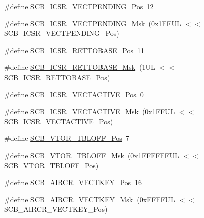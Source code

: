 \begin{DoxyCompactItemize}
\item 
\#define \mbox{\hyperlink{group___c_m_s_i_s___s_c_b_gada60c92bf88d6fd21a8f49efa4a127b8}{S\+C\+B\+\_\+\+I\+C\+S\+R\+\_\+\+V\+E\+C\+T\+P\+E\+N\+D\+I\+N\+G\+\_\+\+Pos}}~12
\item 
\#define \mbox{\hyperlink{group___c_m_s_i_s___s_c_b_gacb6992e7c7ddc27a370f62878a21ef72}{S\+C\+B\+\_\+\+I\+C\+S\+R\+\_\+\+V\+E\+C\+T\+P\+E\+N\+D\+I\+N\+G\+\_\+\+Msk}}~(0x1\+F\+F\+U\+L $<$$<$ S\+C\+B\+\_\+\+I\+C\+S\+R\+\_\+\+V\+E\+C\+T\+P\+E\+N\+D\+I\+N\+G\+\_\+\+Pos)
\item 
\#define \mbox{\hyperlink{group___c_m_s_i_s___s_c_b_ga403d154200242629e6d2764bfc12a7ec}{S\+C\+B\+\_\+\+I\+C\+S\+R\+\_\+\+R\+E\+T\+T\+O\+B\+A\+S\+E\+\_\+\+Pos}}~11
\item 
\#define \mbox{\hyperlink{group___c_m_s_i_s___s_c_b_gaca6fc3f79bb550f64fd7df782ed4a5f6}{S\+C\+B\+\_\+\+I\+C\+S\+R\+\_\+\+R\+E\+T\+T\+O\+B\+A\+S\+E\+\_\+\+Msk}}~(1\+U\+L $<$$<$ S\+C\+B\+\_\+\+I\+C\+S\+R\+\_\+\+R\+E\+T\+T\+O\+B\+A\+S\+E\+\_\+\+Pos)
\item 
\#define \mbox{\hyperlink{group___c_m_s_i_s___s_c_b_gae4f602c7c5c895d5fb687b71b0979fc3}{S\+C\+B\+\_\+\+I\+C\+S\+R\+\_\+\+V\+E\+C\+T\+A\+C\+T\+I\+V\+E\+\_\+\+Pos}}~0
\item 
\#define \mbox{\hyperlink{group___c_m_s_i_s___s_c_b_ga5533791a4ecf1b9301c883047b3e8396}{S\+C\+B\+\_\+\+I\+C\+S\+R\+\_\+\+V\+E\+C\+T\+A\+C\+T\+I\+V\+E\+\_\+\+Msk}}~(0x1\+F\+F\+U\+L $<$$<$ S\+C\+B\+\_\+\+I\+C\+S\+R\+\_\+\+V\+E\+C\+T\+A\+C\+T\+I\+V\+E\+\_\+\+Pos)
\item 
\#define \mbox{\hyperlink{group___c_m_s_i_s___s_c_b_gac6a55451ddd38bffcff5a211d29cea78}{S\+C\+B\+\_\+\+V\+T\+O\+R\+\_\+\+T\+B\+L\+O\+F\+F\+\_\+\+Pos}}~7
\item 
\#define \mbox{\hyperlink{group___c_m_s_i_s___s_c_b_ga75e395ed74042923e8c93edf50f0996c}{S\+C\+B\+\_\+\+V\+T\+O\+R\+\_\+\+T\+B\+L\+O\+F\+F\+\_\+\+Msk}}~(0x1\+F\+F\+F\+F\+F\+F\+U\+L $<$$<$ S\+C\+B\+\_\+\+V\+T\+O\+R\+\_\+\+T\+B\+L\+O\+F\+F\+\_\+\+Pos)
\item 
\#define \mbox{\hyperlink{group___c_m_s_i_s___s_c_b_gaaa27c0ba600bf82c3da08c748845b640}{S\+C\+B\+\_\+\+A\+I\+R\+C\+R\+\_\+\+V\+E\+C\+T\+K\+E\+Y\+\_\+\+Pos}}~16
\item 
\#define \mbox{\hyperlink{group___c_m_s_i_s___s_c_b_ga90c7cf0c490e7ae55f9503a7fda1dd22}{S\+C\+B\+\_\+\+A\+I\+R\+C\+R\+\_\+\+V\+E\+C\+T\+K\+E\+Y\+\_\+\+Msk}}~(0x\+F\+F\+F\+F\+U\+L $<$$<$ S\+C\+B\+\_\+\+A\+I\+R\+C\+R\+\_\+\+V\+E\+C\+T\+K\+E\+Y\+\_\+\+Pos)
\item 
$$
\end{DoxyCompactItemize}
